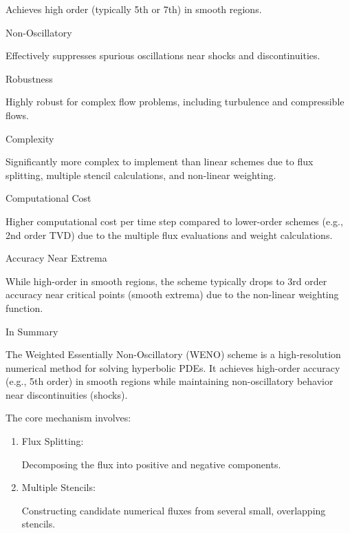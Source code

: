 \documentclass[12pt,a4paper]{article}
\begin{document}
\begin{description}
\begin{description}
Achieves high order (typically 5th or 7th) in smooth regions.  

\item Non-Oscillatory

Effectively suppresses spurious oscillations near shocks and discontinuities. 

\item Robustness

Highly robust for complex flow problems, including turbulence and compressible flows. 

\item Complexity

Significantly more complex to implement than linear schemes due to flux splitting, multiple stencil calculations, and non-linear weighting.  

\item Computational Cost

Higher computational cost per time step compared to lower-order schemes (e.g., 2nd order TVD) due to the multiple flux evaluations and weight calculations.

\item Accuracy Near Extrema

While high-order in smooth regions, the scheme typically drops to 3rd order accuracy near critical points (smooth extrema) due to the non-linear weighting function. 

\end{description}



\item In Summary

The Weighted Essentially Non-Oscillatory (WENO) scheme is a high-resolution numerical method for solving hyperbolic PDEs. It achieves high-order accuracy (e.g., 5th order) in smooth regions while maintaining non-oscillatory behavior near discontinuities (shocks).

The core mechanism involves:

\begin{enumerate}

\item  Flux Splitting:

Decomposing the flux into positive and negative components.

\item  Multiple Stencils:

Constructing candidate numerical fluxes from several small, overlapping stencils.


\end{enumerate}
\end{description}
\end{document}
